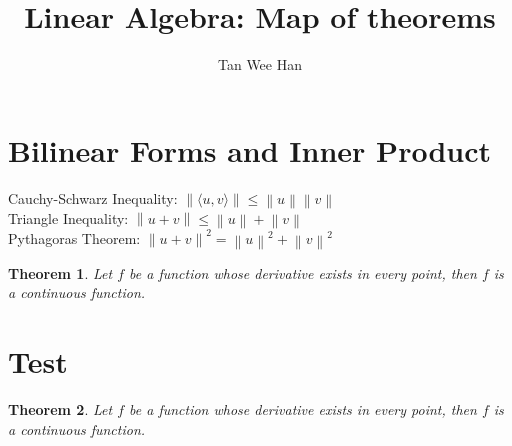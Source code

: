 \documentclass{article}
\newcommand{\norm}[1]{\left\lVert#1\right\rVert}
\newcommand{\innerproduct}[1]{\langle#1\rangle}
\newtheorem{theorem}{Theorem}[section]
\begin{document}
\title{\Large{\textbf{Linear Algebra: Map of theorems}}}
\author{Tan Wee Han}
\maketitle

\let\cleardoublepage\clearpage
\tableofcontents

\pagestyle{plain} %

\makeatletter
\makeatother


\section{Bilinear Forms and Inner Product}
Cauchy-Schwarz Inequality: $\norm{\innerproduct{u,v}} \leq \norm{u}\norm{v}$ \\
Triangle Inequality: $\norm{u+v} \leq \norm{u} + \norm{v}$ \\
Pythagoras Theorem: $\norm{u+v}^2 = \norm{u}^2 + \norm{v}^2$ \bigskip


\noindent 

\begin{theorem}
    Let $f$ be a function whose derivative exists in every point, then $f$ is 
    a continuous function.
\end{theorem}

\section{Test}

\begin{theorem}
    Let $f$ be a function whose derivative exists in every point, then $f$ is 
    a continuous function.
\end{theorem}
\end{document}
